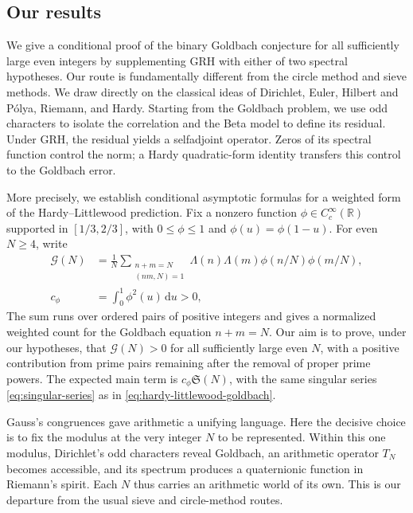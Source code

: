 \documentclass[12pt,a4paper]{amsart}
\numberwithin{equation}{section}
\def\le{\leqslant}
\def\ge{\geqslant}
\theoremstyle{plain}
\theoremstyle{definition}
\theoremstyle{remark}
\begin{document}
\subsection{Our results}\label{story:results}

We give a conditional proof of the binary Goldbach conjecture
for all sufficiently large even integers by supplementing GRH
with either of two spectral hypotheses.
Our route is fundamentally different from the circle method and
sieve methods. We draw directly on the classical ideas of
Dirichlet, Euler, Hilbert and P\'olya, Riemann, and Hardy.
Starting from the Goldbach problem, we use odd characters to
isolate the correlation and the Beta model to define its residual.
Under GRH, the residual yields a selfadjoint operator. Zeros of
its spectral function control the norm; a Hardy quadratic-form
identity transfers this control to the Goldbach error.

More precisely, we establish conditional asymptotic formulas
for a weighted form of the Hardy--Littlewood prediction.
Fix a nonzero function
$\phi\in C_c^\infty(\mathbb R)$ supported in $[1/3,2/3]$,
with $0\le\phi\le1$ and $\phi(u)=\phi(1-u)$. For even
$N\ge4$, write
\begin{align}
 \mathcal G(N)&=\frac1N
   \sum_{\substack{n+m=N\\(nm,N)=1}}
       \Lambda(n)\Lambda(m)\phi(n/N)\phi(m/N),
       \label{eq:goldbach-correlation}\\
 c_\phi&=\int_0^1\phi^2(u)\,\mathrm{d}u>0,
       \label{eq:c0}
\end{align}
The sum runs over ordered pairs of positive integers and gives a
normalized weighted count for the Goldbach equation $n+m=N$.
Our aim is to prove, under our hypotheses, that $\mathcal G(N)>0$
for all sufficiently large even $N$, with a positive contribution
from prime pairs remaining after the removal of proper prime powers.
The expected main term is $c_\phi\mathfrak S(N)$, with the same singular series
\eqref{eq:singular-series} as in \eqref{eq:hardy-littlewood-goldbach}.

Gauss's congruences gave arithmetic a unifying language.
Here the decisive choice is to fix the modulus at the very integer
$N$ to be represented. Within this one modulus, Dirichlet's odd
characters reveal Goldbach, an arithmetic operator $T_N$ becomes
accessible, and its spectrum produces a quaternionic function in
Riemann's spirit. Each $N$ thus carries an arithmetic world of its
own. This is our departure from the usual sieve and circle-method
routes.
\end{document}
